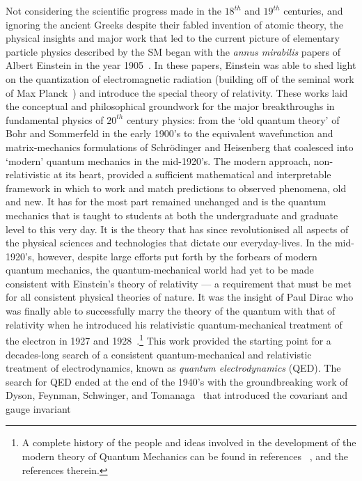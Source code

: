 Not considering the scientific progress made in the $18^{th}$ and $19^{th}$ centuries, and
ignoring the ancient Greeks despite their fabled invention of atomic theory,
the physical insights and major work that led to the current picture of elementary particle
physics described by the SM began with the \textit{annus mirabilis} papers of Albert
Einstein in the year 1905~\cite{einsteinPEE,einsteinSpecial,einsteinEnergyMass}.
In these papers, Einstein was able to shed light on the quantization of electromagnetic
radiation (building off of the seminal work of Max Planck~\cite{planckBlackBody})
and introduce the special theory of relativity.
These works laid the conceptual
and philosophical groundwork for the major breakthroughs in fundamental physics
of $20^{th}$ century physics: from the `old quantum theory' of Bohr and Sommerfeld
in the early 1900's to the equivalent wavefunction and matrix-mechanics formulations
of Schr{\"o}dinger and Heisenberg that
coalesced into `modern' quantum mechanics in the mid-1920's.
The modern approach, non-relativistic at its heart, provided a sufficient mathematical
and interpretable framework in which to work and match predictions to observed phenomena, old
and new. It has for the most part remained unchanged and is the quantum mechanics that is taught to
students at both the undergraduate and graduate level to this very day.
It is the theory that has since revolutionised all aspects of the physical sciences and
technologies that dictate our everyday-lives.
In the mid-1920's, however, despite
large efforts put forth by the forbears of modern quantum mechanics, the quantum-mechanical
world had yet to be made consistent with Einstein's theory of relativity --- a requirement
that must be met for all consistent physical theories of nature.
It was the insight of Paul Dirac who was finally able to successfully
marry the theory of the quantum with that of relativity when he introduced
his relativistic quantum-mechanical treatment of the electron in 1927 and 1928~\cite{diracEquation,Dirac:1927dy}.\footnote{
A complete history of the people and ideas involved in the development of the modern
theory of Quantum Mechanics can be found in references ~\cite{boffiRiseOfQM,historyQM},
and the references therein.
}
This work provided the starting point for a decades-long search of a consistent quantum-mechanical
and relativistic treatment of electrodynamics, known as \textit{quantum electrodynamics} (QED).
The search for QED ended at the end of the 1940's with the groundbreaking work of Dyson, Feynman, Schwinger, and Tomanaga~\cite{qedTomonaga,qedFeynman0,qedFeynman1,qedFeynman2,qedSchwinger0,qedSchwinger1,qedDyson0,qedDyson1} that introduced the covariant and gauge invariant
